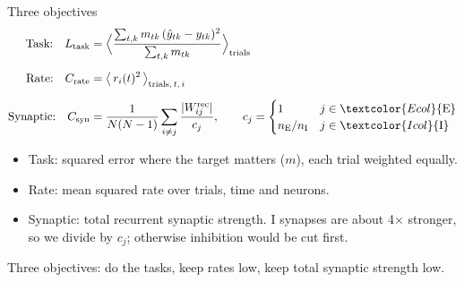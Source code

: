 \documentclass[aspectratio=169]{beamer}
\newcommand{\takeaway}[1]{\par\vfill\noindent\colorbox{black!6}{\parbox{\dimexpr\linewidth-2\fboxsep\relax}{\small #1}}}
\begin{document}
\begin{frame}{Three objectives}
  \small
  \begin{align*}
    \text{Task:}\quad L_{\text{task}} &= \Big\langle \frac{\sum_{t,k} m_{tk}\,(\hat y_{tk} - y_{tk})^2}{\sum_{t,k} m_{tk}} \Big\rangle_{\text{trials}}\\[0.6em]
    \text{Rate:}\quad C_{\text{rate}} &= \big\langle\, r_i(t)^2 \,\big\rangle_{\text{trials},\,t,\,i}\\[0.6em]
    \text{Synaptic:}\quad C_{\text{syn}} &= \frac{1}{N(N-1)} \sum_{i \neq j} \frac{|W^{\mathrm{rec}}_{ij}|}{c_j},
      \qquad c_j = \begin{cases} 1 & j \in \textcolor{Ecol}{\text{E}}\\ n_{\text{E}}/n_{\text{I}} & j \in \textcolor{Icol}{\text{I}} \end{cases}
  \end{align*}
  \footnotesize
  \begin{itemize}
    \item Task: squared error where the target matters ($m$), each trial weighted equally.
    \item Rate: mean squared rate over trials, time and neurons.
    \item Synaptic: total recurrent synaptic strength. \textcolor{Icol}{I} synapses are about 4$\times$ stronger,
          so we divide by $c_j$; otherwise inhibition would be cut first.
  \end{itemize}
  \takeaway{Three objectives: do the tasks, keep rates low, keep total synaptic strength low.}
\end{frame}
\end{document}
